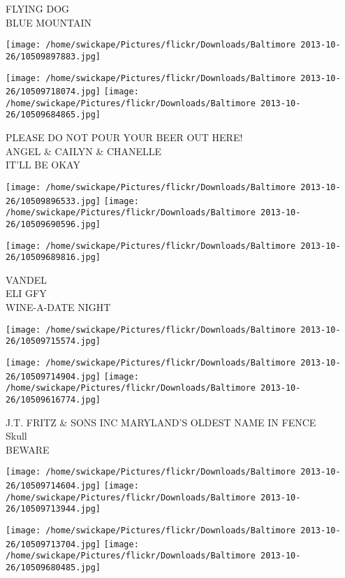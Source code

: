 \documentclass[10pt,letterpaper]{article}
\begin{document}
FLYING DOG\\
BLUE MOUNTAIN
\pagebreak

\texttt{[image: /home/swickape/Pictures/flickr/Downloads/Baltimore 2013-10-26/10509897883.jpg]}

\vspace{0.25in}
\texttt{[image: /home/swickape/Pictures/flickr/Downloads/Baltimore 2013-10-26/10509718074.jpg]}
\texttt{[image: /home/swickape/Pictures/flickr/Downloads/Baltimore 2013-10-26/10509684865.jpg]}

PLEASE DO NOT POUR YOUR BEER OUT HERE!\\
ANGEL \& CAILYN \& CHANELLE\\
IT'LL BE OKAY
\pagebreak

\texttt{[image: /home/swickape/Pictures/flickr/Downloads/Baltimore 2013-10-26/10509896533.jpg]}
\texttt{[image: /home/swickape/Pictures/flickr/Downloads/Baltimore 2013-10-26/10509690596.jpg]}

\vspace{0.25in}
\texttt{[image: /home/swickape/Pictures/flickr/Downloads/Baltimore 2013-10-26/10509689816.jpg]}

VANDEL\\
ELI GFY\\
WINE{-}A{-}DATE NIGHT
\pagebreak

\texttt{[image: /home/swickape/Pictures/flickr/Downloads/Baltimore 2013-10-26/10509715574.jpg]}

\vspace{0.25in}
\texttt{[image: /home/swickape/Pictures/flickr/Downloads/Baltimore 2013-10-26/10509714904.jpg]}
\texttt{[image: /home/swickape/Pictures/flickr/Downloads/Baltimore 2013-10-26/10509616774.jpg]}

J.T. FRITZ \& SONS INC MARYLAND'S OLDEST NAME IN FENCE\\
Skull\\
BEWARE
\pagebreak

\texttt{[image: /home/swickape/Pictures/flickr/Downloads/Baltimore 2013-10-26/10509714604.jpg]}
\texttt{[image: /home/swickape/Pictures/flickr/Downloads/Baltimore 2013-10-26/10509713944.jpg]}

\texttt{[image: /home/swickape/Pictures/flickr/Downloads/Baltimore 2013-10-26/10509713704.jpg]}
\texttt{[image: /home/swickape/Pictures/flickr/Downloads/Baltimore 2013-10-26/10509680485.jpg]}
\end{document}
